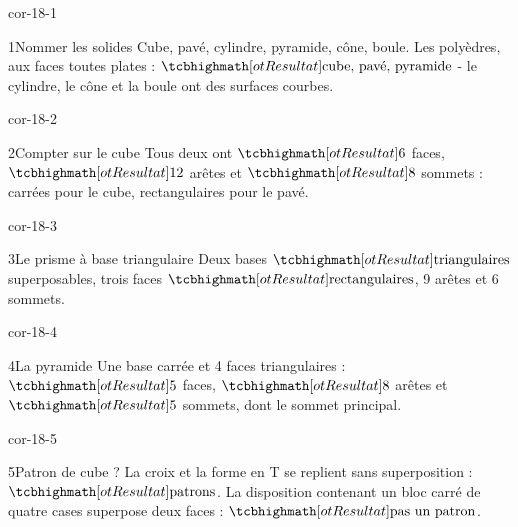\clearpage\pagestyle{otMain}\setlength{\otBlocEspacement}{2.5mm}\fontsize{11}{15}\selectfont{}
\begin{blocLivre}{cor-18-1}\begin{corrige}{1}{Nommer les solides}
Cube, pavé, cylindre, pyramide, cône, boule. Les polyèdres, aux faces toutes plates : $\res{\text{cube, pavé, pyramide}}$ - le cylindre, le cône et la boule ont des surfaces courbes.
\label{fig-cor-18-1}
\end{corrige}\end{blocLivre}
\begin{blocLivre}{cor-18-2}\begin{corrige}{2}{Compter sur le cube}
Tous deux ont $\res6$ faces, $\res{12}$ arêtes et $\res8$ sommets : carrées pour le cube, rectangulaires pour le pavé.
\label{fig-cor-18-2}
\end{corrige}\end{blocLivre}
\begin{blocLivre}{cor-18-3}\begin{corrige}{3}{Le prisme à base triangulaire}
Deux bases $\res{\text{triangulaires}}$ superposables, trois faces $\res{\text{rectangulaires}}$, 9 arêtes et 6 sommets.
\label{fig-cor-18-3}
\end{corrige}\end{blocLivre}
\begin{blocLivre}{cor-18-4}\begin{corrige}{4}{La pyramide}
Une base carrée et 4 faces triangulaires : $\res5$ faces, $\res8$ arêtes et $\res5$ sommets, dont le sommet principal.
\label{fig-cor-18-4}
\end{corrige}\end{blocLivre}
\begin{blocLivre}{cor-18-5}\begin{corrige}{5}{Patron de cube ?}
La croix et la forme en T se replient sans superposition : $\res{\text{patrons}}$. La disposition contenant un bloc carré de quatre cases superpose deux faces : $\res{\text{pas un patron}}$.
\label{fig-cor-18-5}
\end{corrige}\end{blocLivre}
